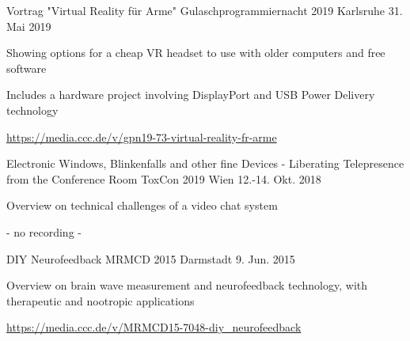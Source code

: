 
\begin{cventries}
  \cventry
    { Vortrag "Virtual Reality für Arme" } %
    {Gulaschprogrammiernacht 2019} %
    {Karlsruhe} %
    {31. Mai 2019} %
    {
      \begin{cvitems} %
        \item {Showing options for a cheap VR headset to use with older computers and free software}
        \item {Includes a hardware project involving DisplayPort and USB Power Delivery technology}
        \item {\href{https://media.ccc.de/v/gpn19-73-virtual-reality-fr-arme }{https://media.ccc.de/v/gpn19-73-virtual-reality-fr-arme } }
      \end{cvitems}
    }
  \cventry
    { Electronic Windows, Blinkenfalls and other fine Devices - Liberating Telepresence from the Conference Room } %
    {ToxCon 2019} %
    {Wien} %
    {12.-14. Okt. 2018} %
    {
      \begin{cvitems} %
        \item { Overview on technical challenges of a video chat system }
        \item { - no recording - }
      \end{cvitems}
    }


  \cventry
    { DIY Neurofeedback } %
    {MRMCD 2015} %
    {Darmstadt} %
    {9. Jun. 2015} %
    {
      \begin{cvitems} %
        \item {Overview on brain wave measurement and neurofeedback technology, with therapeutic and nootropic applications}
        \item {\href{https://media.ccc.de/v/MRMCD15-7048-diy\_neurofeedback }{https://media.ccc.de/v/MRMCD15-7048-diy\_neurofeedback } }
      \end{cvitems}
    }

\end{cventries}
